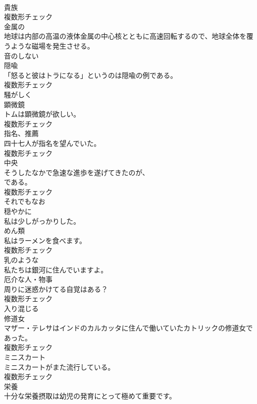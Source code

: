 \documentclass[8pt]{extreport}
\begin{document}
\begin{CJK}{UTF8}{min}
\\	[名詞]	貴族	
\\	複数形チェック
\\	[形容詞]	金属の	
\\	地球は内部の高温の液体金属の中心核とともに高速回転するので、地球全体を覆うような磁場を発生させる。	
\\	[形容詞]	音のしない	
\\	[名詞]	隠喩	
\\	「怒ると彼はトラになる」というのは隠喩の例である。	
\\	複数形チェック
\\	[副詞]	騒がしく	
\\	[名詞]	顕微鏡	
\\	トムは顕微鏡が欲しい。	
\\	複数形チェック
\\	[名詞]	指名、推薦	
\\	四十七人が指名を望んでいた。	
\\	複数形チェック
\\	[名詞]	中央	
\\	そうしたなかで急速な進歩を遂げてきたのが、
\\	である。	
\\	複数形チェック
\\	[副詞]	それでもなお	
\\	[副詞]	穏やかに	
\\	私は少しがっかりした。	
\\	[名詞]	めん類	
\\	私はラーメンを食べます。	
\\	複数形チェック
\\	[形容詞]	乳のような	
\\	私たちは銀河に住んでいますよ。	
\\	[名詞]	厄介な人・物事	
\\	周りに迷惑かけてる自覚はある？	
\\	複数形チェック
\\	[動詞]	入り混じる	
\\	[名詞]	修道女	
\\	マザー・テレサはインドのカルカッタに住んで働いていたカトリックの修道女であった。	
\\	複数形チェック
\\	[名詞]	ミニスカート	
\\	ミニスカートがまた流行している。	
\\	複数形チェック
\\	[名詞]	栄養	
\\	十分な栄養摂取は幼児の発育にとって極めて重要です。	

\end{CJK}
\end{document}
